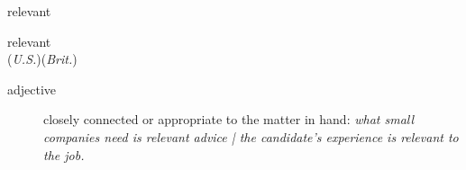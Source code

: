 \documentclass[avery5372, grid]{flashcards}
\begin{document}
\begin{flashcard}{\Huge relevant}
	\begin{center}
		{\LARGE rel\textbullet e\textbullet vant}\\
		(\textit{U.S.})\hspace{0.25cm}(\textit{Brit.})
	\end{center}
	\begin{description}
		
			
			
			
		
			
			
			
		
		\item[adjective] %
			closely connected or appropriate to the matter in hand: \textit{what small companies need is relevant advice | the candidate's experience is relevant to the job.}
			

\end{description}
\end{flashcard}
\end{document}
